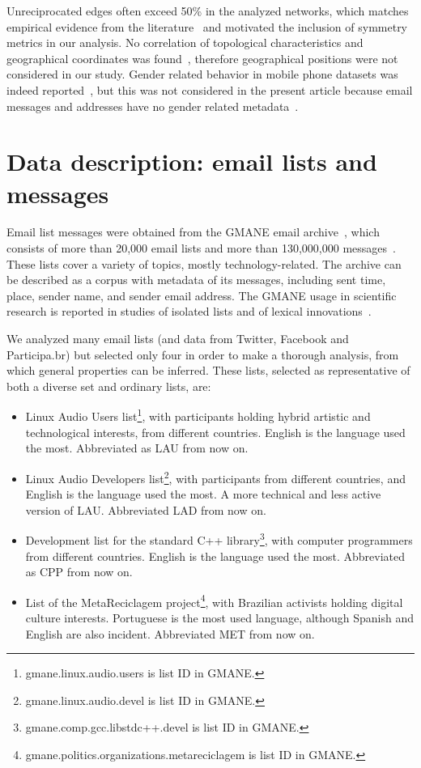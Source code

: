 \documentclass[%
	aip,
	jmp,%
	amsmath,amssymb,
	reprint,%
]{revtex4-1}
\begin{document}
Unreciprocated edges often exceed 50\% in the analyzed networks, which matches empirical evidence from the literature~\cite{newmanEvolving} and motivated the inclusion of symmetry metrics in our analysis. No correlation of topological characteristics and geographical coordinates was found~\cite{barabasiGeo}, therefore geographical positions were not considered in our study. Gender related behavior in mobile phone datasets was indeed reported~\cite{barabasiSex}, but this was not considered in the present article because email messages and addresses have no gender related metadata~\cite{gmanePack}.


\section{Data description: email lists and messages}\label{sec:data}

Email list messages were obtained from
the GMANE email archive~\cite{gmanePack}, which consists of more than 20,000 email lists and more than 130,000,000 messages~\cite{GMANEwikipedia}. These lists cover a variety of topics, mostly technology-related. The archive can be described as a corpus with metadata of its messages, including sent time, place, sender name, and sender email address.
The GMANE usage in scientific research is reported in studies of isolated lists and of lexical innovations~\cite{GMANE2,bird}. 

We analyzed many email lists (and data from Twitter, Facebook and Participa.br) but selected only four in order to make a thorough analysis, from which general properties can be inferred. These lists, selected as representative of both a diverse set and ordinary lists, are:
\begin{itemize}
	\item Linux Audio Users list\footnote{gmane.linux.audio.users is list ID in GMANE.}, with participants holding hybrid artistic and technological interests, from different countries. English is the language used the most. Abbreviated as LAU from now on.
	\item Linux Audio Developers list\footnote{gmane.linux.audio.devel is list ID in GMANE.}, with participants from different countries, and English is the language used the most. A more technical and less active version of LAU. Abbreviated LAD from now on.
	\item Development list for the standard C++ library\footnote{gmane.comp.gcc.libstdc++.devel is list ID in GMANE.}, with computer programmers from different countries. English is the language used the most. Abbreviated as CPP from now on.
	\item List of the MetaReciclagem project\footnote{gmane.politics.organizations.metareciclagem is list ID in GMANE.}, with Brazilian activists holding digital culture interests. Portuguese is the most used language, although Spanish and English are also incident. Abbreviated MET from now on.
\end{itemize} 
\end{document}
